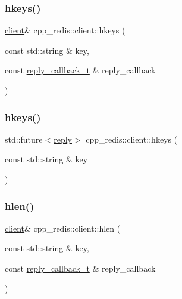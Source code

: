 \subsubsection{\texorpdfstring{hkeys()}{hkeys()}\hspace{0.1cm}{\footnotesize\ttfamily [1/2]}}
{\footnotesize\ttfamily \hyperlink{classcpp__redis_1_1client}{client}\& cpp\+\_\+redis\+::client\+::hkeys (\begin{DoxyParamCaption}\item[{const std\+::string \&}]{key,  }\item[{const \hyperlink{classcpp__redis_1_1client_a061a1140d36d2eaeda82b09a0bb3f9f2}{reply\+\_\+callback\+\_\+t} \&}]{reply\+\_\+callback }\end{DoxyParamCaption})}

\mbox{\label{classcpp__redis_1_1client_a578dade240f8fbbd6ba797bff9be18dd}} 
\subsubsection{\texorpdfstring{hkeys()}{hkeys()}\hspace{0.1cm}{\footnotesize\ttfamily [2/2]}}
{\footnotesize\ttfamily std\+::future$<$\hyperlink{classcpp__redis_1_1reply}{reply}$>$ cpp\+\_\+redis\+::client\+::hkeys (\begin{DoxyParamCaption}\item[{const std\+::string \&}]{key }\end{DoxyParamCaption})}

\mbox{\label{classcpp__redis_1_1client_a88b88d74f77f2a59bc75b7d1fcdbd483}} 
\subsubsection{\texorpdfstring{hlen()}{hlen()}\hspace{0.1cm}{\footnotesize\ttfamily [1/2]}}
{\footnotesize\ttfamily \hyperlink{classcpp__redis_1_1client}{client}\& cpp\+\_\+redis\+::client\+::hlen (\begin{DoxyParamCaption}\item[{const std\+::string \&}]{key,  }\item[{const \hyperlink{classcpp__redis_1_1client_a061a1140d36d2eaeda82b09a0bb3f9f2}{reply\+\_\+callback\+\_\+t} \&}]{reply\+\_\+callback }\end{DoxyParamCaption})}


